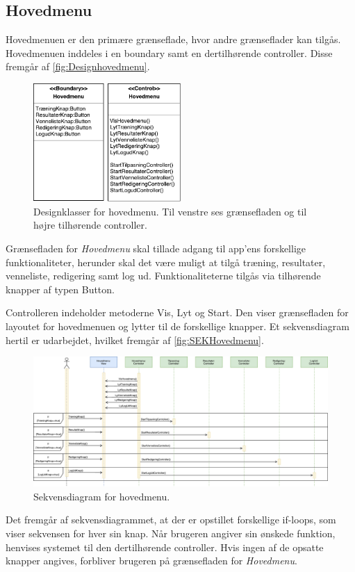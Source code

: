 \subsection*{Hovedmenu} \label{sec:MVCHovedmenu}
Hovedmenuen er den primære grænseflade, hvor andre grænseflader kan tilgås.
Hovedmenuen inddeles i en boundary samt en dertilhørende controller. Disse fremgår af \autoref{fig:Designhovedmenu}.

\begin{figure} [H]
\centering
\includegraphics[width=0.5\textwidth]{figures/MVC/MVCHovedmenu}
\caption{Designklasser for hovedmenu. Til venstre ses grænsefladen og til højre tilhørende controller.}
\label{fig:Designhovedmenu}
\end{figure}

\noindent
Grænsefladen for \textit{Hovedmenu} skal tillade adgang til app'ens forskellige funktionaliteter, herunder skal det være muligt at tilgå træning, resultater, venneliste, redigering samt log ud. Funktionaliteterne tilgås via tilhørende knapper af typen Button. 

Controlleren indeholder metoderne Vis, Lyt og Start. Den viser grænsefladen for layoutet for hovedmenuen og lytter til de forskellige knapper. Et sekvensdiagram hertil er udarbejdet, hvilket fremgår af \autoref{fig:SEKHovedmenu}. 

\begin{figure} [H]
\centering
\includegraphics[width=1.55\textwidth, angle=90]{figures/Sek/SEKHovedmenu}
\caption{Sekvensdiagram for hovedmenu.}
\label{fig:SEKHovedmenu}
\end{figure}

\noindent
Det fremgår af sekvensdiagrammet, at der er opstillet forskellige if-loops, som viser sekvensen for hver sin knap. Når brugeren angiver sin ønskede funktion, henvises systemet til den dertilhørende controller. Hvis ingen af de opsatte knapper angives, forbliver brugeren på grænsefladen for \textit{Hovedmenu}.